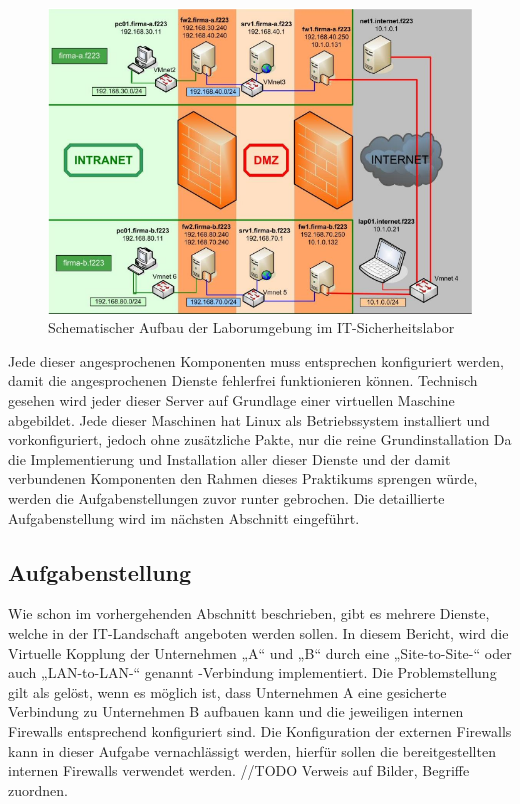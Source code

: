 \documentclass[
a4paper,     %
 headsepline, %
footsepline, %
titlepage,   %
 halfparskip,     %
 fleqn,       %
12pt         %
]{scrartcl}  %
\begin{document}
\begin{figure}[h]
	\includegraphics[width=\textwidth]{pictures/laborumgebung.png}
	\caption{Schematischer Aufbau der Laborumgebung im IT-Sicherheitslabor \cite{JueNeuSaDue}}
	\label{fig:appStat}
\end{figure}

Jede dieser angesprochenen Komponenten muss entsprechen konfiguriert werden, damit die angesprochenen Dienste fehlerfrei funktionieren können.
Technisch gesehen wird jeder dieser Server auf Grundlage einer virtuellen Maschine abgebildet.
Jede dieser Maschinen hat Linux als Betriebssystem installiert und vorkonfiguriert, jedoch ohne zusätzliche Pakte, nur die reine Grundinstallation   
Da die Implementierung und Installation aller dieser Dienste und der damit verbundenen Komponenten den Rahmen dieses Praktikums sprengen würde, werden die Aufgabenstellungen zuvor runter gebrochen. Die detaillierte Aufgabenstellung wird im nächsten Abschnitt eingeführt.

\subsection{Aufgabenstellung}
Wie schon im vorhergehenden Abschnitt beschrieben, gibt es mehrere Dienste, welche in der IT-Landschaft angeboten werden sollen. 
In diesem Bericht, wird die Virtuelle Kopplung der Unternehmen „A“ und „B“ durch eine „Site-to-Site-“ oder auch „LAN-to-LAN-“ genannt -Verbindung implementiert. 
Die Problemstellung gilt als gelöst, wenn es möglich ist, dass Unternehmen A eine gesicherte Verbindung zu Unternehmen B aufbauen kann und die jeweiligen internen Firewalls entsprechend konfiguriert sind. Die Konfiguration der externen Firewalls kann in dieser Aufgabe vernachlässigt werden, hierfür sollen die bereitgestellten internen Firewalls verwendet werden. 
//TODO Verweis auf Bilder, Begriffe zuordnen. 
 
\end{document}
